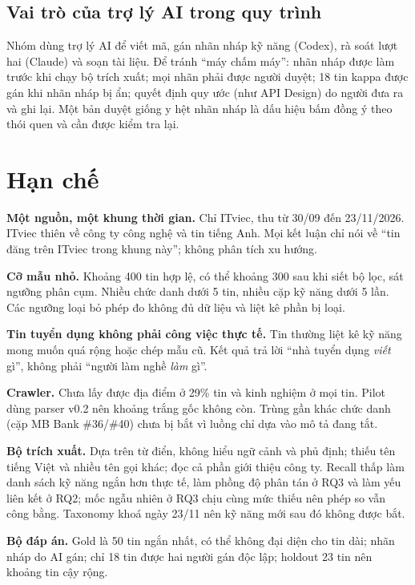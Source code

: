\documentclass[12pt]{article}
\begin{document}
\subsection{Vai trò của trợ lý AI trong quy trình}

Nhóm dùng trợ lý AI để viết mã, gán nhãn nháp kỹ năng (Codex), rà soát lượt hai (Claude) và soạn tài liệu. Để tránh ``máy chấm máy'': nhãn nháp được làm trước khi chạy bộ trích xuất; mọi nhãn phải được người duyệt; 18 tin kappa được gán khi nhãn nháp bị ẩn; quyết định quy ước (như API Design) do người đưa ra và ghi lại. Một bản duyệt giống y hệt nhãn nháp là dấu hiệu bấm đồng ý theo thói quen và cần được kiểm tra lại.

\newpage
\section{Hạn chế}

\textbf{Một nguồn, một khung thời gian.} Chỉ ITviec, thu từ 30/09 đến 23/11/2026. ITviec thiên về công ty công nghệ và tin tiếng Anh. Mọi kết luận chỉ nói về ``tin đăng trên ITviec trong khung này''; không phân tích xu hướng.

\textbf{Cỡ mẫu nhỏ.} Khoảng 400 tin hợp lệ, có thể khoảng 300 sau khi siết bộ lọc, sát ngưỡng phân cụm. Nhiều chức danh dưới 5 tin, nhiều cặp kỹ năng dưới 5 lần. Các ngưỡng loại bỏ phép đo không đủ dữ liệu và liệt kê phần bị loại.

\textbf{Tin tuyển dụng không phải công việc thực tế.} Tin thường liệt kê kỹ năng mong muốn quá rộng hoặc chép mẫu cũ. Kết quả trả lời ``nhà tuyển dụng \textit{viết} gì'', không phải ``người làm nghề \textit{làm} gì''.

\textbf{Crawler.} Chưa lấy được địa điểm ở 29\% tin và kinh nghiệm ở mọi tin. Pilot dùng parser v0.2 nên khoảng trắng gốc không còn. Trùng gần khác chức danh (cặp MB Bank \#36/\#40) chưa bị bắt vì luồng chỉ dựa vào mô tả đang tắt.

\textbf{Bộ trích xuất.} Dựa trên từ điển, không hiểu ngữ cảnh và phủ định; thiếu tên tiếng Việt và nhiều tên gọi khác; đọc cả phần giới thiệu công ty. Recall thấp làm danh sách kỹ năng ngắn hơn thực tế, làm phồng độ phân tán ở RQ3 và làm yếu liên kết ở RQ2; mốc ngẫu nhiên ở RQ3 chịu cùng mức thiếu nên phép so vẫn công bằng. Taxonomy khoá ngày 23/11 nên kỹ năng mới sau đó không được bắt.

\textbf{Bộ đáp án.} Gold là 50 tin ngắn nhất, có thể không đại diện cho tin dài; nhãn nháp do AI gán; chỉ 18 tin được hai người gán độc lập; holdout 23 tin nên khoảng tin cậy rộng.
\end{document}
